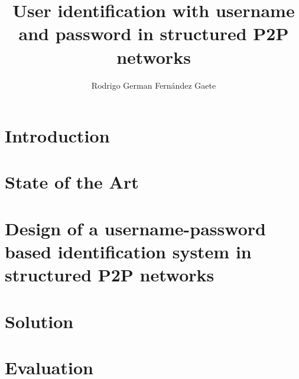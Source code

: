 \documentclass[letter, 12pt]{report}
\title{User identification with username and password in structured P2P networks}
\author{Rodrigo German Fernández Gaete}
\begin{document}


\beforepreface



%


\newpage

\afterpreface


\renewcommand{\chaptername}{Chapter}
\setcounter{secnumdepth}{3}
\setcounter{tocdepth}{3}

\chapter{Introduction}
\label{sec:intro}



\chapter{State of the Art}
\label{sec:soa_p2p}


\label{sec:soa_p2p_user_identification}


\label{sec:soa_p2p_trust}


\chapter{Design of a username-password based identification system in structured P2P networks}
\label{sec:formalization}

\chapter{Solution}
\label{sec:system}


\chapter{Evaluation}
\label{sec:evaluation}

\end{document}
